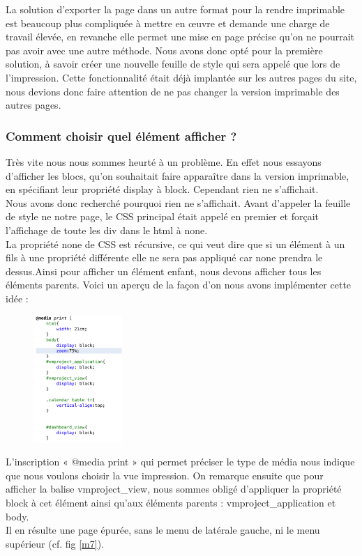 \documentclass[12pt]{report}
\begin{document}
\begin{enumerate}
La solution d’exporter la page dans un autre format pour la rendre imprimable est beaucoup plus compliquée à mettre en œuvre et demande une charge de travail élevée, en revanche elle permet une mise en page précise qu’on ne pourrait pas avoir avec une autre méthode. Nous avons donc opté pour la première solution, à savoir créer une nouvelle feuille de style qui sera appelé que lors de l’impression. Cette fonctionnalité était déjà implantée sur les autres pages du site, nous devions donc faire attention de ne pas changer la version imprimable des autres pages.\\

\subsubsection{Comment choisir quel élément afficher ?}
Très vite nous nous sommes heurté à un problème. En effet nous essayons d’afficher les blocs, qu’on souhaitait faire apparaître dans la version imprimable, en spécifiant leur propriété display à block. Cependant rien ne s’affichait.\\

Nous avons donc recherché pourquoi rien ne s’affichait. Avant d’appeler la feuille de style ne notre page, le CSS principal était appelé en premier et forçait l’affichage de toute les div dans le html à none.\\

La propriété none de CSS est récursive, ce qui veut dire que si un élément à un fils à une propriété différente elle ne sera pas appliqué car none prendra le dessus.Ainsi pour afficher un élément enfant, nous devons afficher tous les éléments parents. Voici un aperçu de la façon d’on nous avons implémenter cette idée :\\

\begin{figure}[H]
	\centering
	\includegraphics[width=0.3\textwidth]{pictures/matthieu/m_css_imprimabe.png}
	\caption{}
	\label{m6}
\end{figure}

L’inscription « @media print » qui permet préciser le type de média nous indique que nous voulons choisir la vue impression. On remarque ensuite que pour afficher la balise vmproject\_view, nous sommes obligé d’appliquer la propriété block à cet élément ainsi qu’aux éléments parents : vmproject\_application et body.\\

Il en résulte une page épurée, sans le menu de latérale gauche, ni le menu supérieur (cf. fig \ref{m7}).

\end{enumerate}
	
\end{document}

